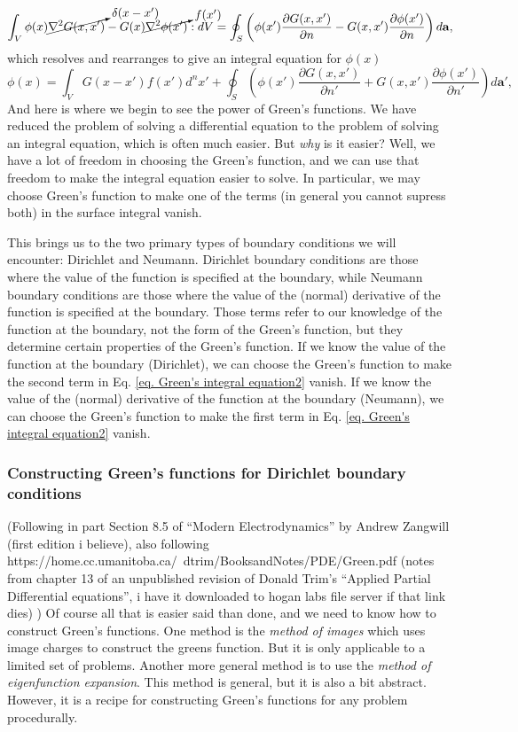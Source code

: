 \documentclass[../../main.tex]{subfiles} %
\begin{document}
\begin{equation} \label{eq. Green's integral equation1}
    \int_V \phi(x)\cancelto{\delta(x-x')}{\nabla^2G(x,x')} - G(x)\cancelto{f(x')}{\nabla^2\phi(x')} :dV= \oint_S \left(\phi(x')\frac{\partial G(x,x')}{\partial n} - G(x,x')\frac{\partial \phi(x')}{\partial n}\right) d\mathbf{a},
\end{equation}
which resolves and rearranges to give an integral equation for $\phi(x)$
\begin{equation}\label{eq. Green's integral equation2}
    \phi(x)=\int_V G(x-x')f(x')d^nx' + \oint_S \left(\phi(x')\frac{\partial G(x,x')}{\partial n'} + G(x,x')\frac{\partial \phi(x')}{\partial n'}\right) d\mathbf{a'},
\end{equation}
And here is where we begin to see the power of Green's functions. We have reduced the problem of solving a differential equation to the problem of solving an integral equation, which is often much easier. But \textit{why} is it easier? Well, we have a lot of freedom in choosing the Green's function, and we can use that freedom to make the integral equation easier to solve. In particular, we may choose Green's function to make one of the terms (in general you cannot supress both) in the surface integral vanish. 

This brings us to the two primary types of boundary conditions we will encounter: Dirichlet and Neumann. Dirichlet boundary conditions are those where the value of the function is specified at the boundary, while Neumann boundary conditions are those where the value of the (normal) derivative of the function is specified at the boundary. Those terms refer to our knowledge of the function at the boundary, not the form of the Green's function, but they determine certain properties of the Green's function. If we know the value of the function at the boundary (Dirichlet), we can choose the Green's function to make the second term in Eq. \ref{eq. Green's integral equation2} vanish. If we know the value of the (normal) derivative of the function at the boundary (Neumann), we can choose the Green's function to make the first term in Eq. \ref{eq. Green's integral equation2} vanish.

\subsubsection{Constructing Green's functions for Dirichlet boundary conditions}
(Following in part Section 8.5 of ``Modern Electrodynamics'' by Andrew Zangwill (first edition i believe), also following https://home.cc.umanitoba.ca/~dtrim/BooksandNotes/PDE/Green.pdf (notes from chapter 13 of an unpublished revision of Donald Trim's ``Applied Partial Differential equations'', i have it downloaded to hogan labs file server if that link dies) ) Of course all that is easier said than done, and we need to know how to construct Green's functions. One method is the \emph{method of images} which uses image charges to construct the greens function. But it is only applicable to a limited set of problems. Another more general method is to use the \emph{method of eigenfunction expansion}. This method is general, but it is also a bit abstract. However, it is a recipe for constructing Green's functions for any problem procedurally. 
\end{document}
